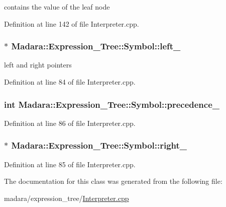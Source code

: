 contains the value of the leaf node 



Definition at line 142 of file Interpreter.cpp.

\hypertarget{classMadara_1_1Expression__Tree_1_1Symbol_a7808eb3daad675e2e01409f173a41cee}{
\subsubsection[{left\_\-}]{$\ast$ {\bf Madara::Expression\_\-Tree::Symbol::left\_\-}}}
\label{d5/d85/classMadara_1_1Expression__Tree_1_1Symbol_a7808eb3daad675e2e01409f173a41cee}


left and right pointers 



Definition at line 84 of file Interpreter.cpp.

\hypertarget{classMadara_1_1Expression__Tree_1_1Symbol_a2de31139261eea47dccd48d377780803}{
\subsubsection[{precedence\_\-}]{\setlength{\rightskip}{0pt plus 5cm}int {\bf Madara::Expression\_\-Tree::Symbol::precedence\_\-}}}
\label{d5/d85/classMadara_1_1Expression__Tree_1_1Symbol_a2de31139261eea47dccd48d377780803}


Definition at line 86 of file Interpreter.cpp.

\hypertarget{classMadara_1_1Expression__Tree_1_1Symbol_a13467d1c78fbf06c3d64a6a4770eee7a}{
\subsubsection[{right\_\-}]{$\ast$ {\bf Madara::Expression\_\-Tree::Symbol::right\_\-}}}
\label{d5/d85/classMadara_1_1Expression__Tree_1_1Symbol_a13467d1c78fbf06c3d64a6a4770eee7a}


Definition at line 85 of file Interpreter.cpp.



The documentation for this class was generated from the following file:\begin{DoxyCompactItemize}
\item 
madara/expression\_\-tree/\hyperlink{Interpreter_8cpp}{Interpreter.cpp}\end{DoxyCompactItemize}
